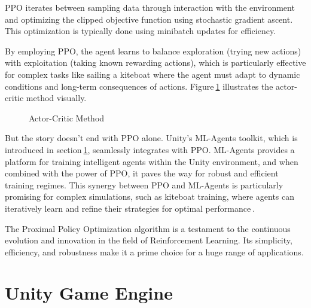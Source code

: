 PPO iterates between sampling data through interaction with the environment and optimizing the clipped objective function using stochastic gradient ascent. This optimization is typically done using minibatch updates for efficiency.

By employing PPO, the agent learns to balance exploration (trying new actions) with exploitation (taking known rewarding actions), which is particularly effective for complex tasks like sailing a kiteboat where the agent must adapt to dynamic conditions and long-term consequences of actions. Figure$~$\ref{actor_critic} illustrates the actor-critic method visually.

\begin{figure}
    \centering
    \caption{Actor-Critic Method}\label{actor_critic}
\end{figure}

But the story doesn't end with PPO alone. Unity's ML-Agents toolkit, which is introduced in section$~$\ref{unity}, seamlessly integrates with PPO. ML-Agents provides a platform for training intelligent agents within the Unity environment, and when combined with the power of PPO, it paves the way for robust and efficient training regimes. This synergy between PPO and ML-Agents is particularly promising for complex simulations, such as kiteboat training, where agents can iteratively learn and refine their strategies for optimal performance$~$\cite{mlagents_ppo}.

The Proximal Policy Optimization algorithm is a testament to the continuous evolution and innovation in the field of Reinforcement Learning. Its simplicity, efficiency, and robustness make it a prime choice for a huge range of applications. 


\section{Unity Game Engine}\label{unity}

